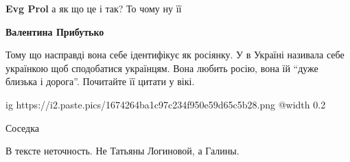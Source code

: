 \begin{itemize}
\begin{itemize}
\textbf{Evg Prol} а як що це і так? То чому ну її

\begin{itemize} %
\textbf{Валентина Прибутько} 

Тому що насправді вона себе ідентифікує як росіянку. У в Україні називала себе
українкою щоб сподобатися українцям. Вона любить росію, вона їй \enquote{дуже близька і
дорога}. Почитайте її цитати у вікі.

\end{itemize} %


\end{itemize} %


\ifcmt
  ig https://i2.paste.pics/1674264ba1c97c234f950e59d65c5b28.png
  @width 0.2
\fi

Соседка

В тексте неточность. Не Татьяны Логиновой, а Галины.

\end{itemize} %
